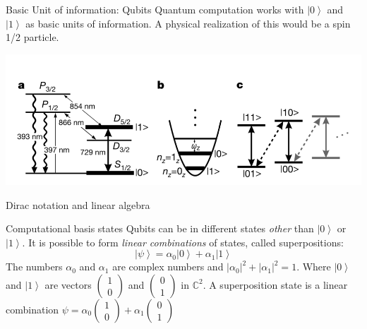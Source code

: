 \documentclass{beamer}
\newcommand{\ket}[1]{\left| #1 \right>} %
\begin{document}
\begin{frame}{Basic Unit of information: Qubits}
	\justifying
	Quantum computation works with $\ket{0}$ and $\ket{1}$ as basic units of information. A physical realization of this would be a spin 1/2 particle.
	
	\center
	\includegraphics[keepaspectratio=true,width=.8\paperwidth]{.attachments/Qubit.png}
\end{frame}

\begin{frame}{Dirac notation and linear algebra}
	\justifying 

	
	
\end{frame}

\begin{frame}{Computational basis states}
	\justifying
	Qubits can be in different states \textit{other} than $\ket{0}$ or $\ket{1}$. It is possible to form \textit{linear combinations} of states, called superpositions:
	$$\ket{\psi}= \alpha_0 \ket{0} + \alpha_1 \ket{1}$$
    The numbers $\alpha_0$ and $\alpha_1$ are complex numbers and ${|\alpha_0|}^2+|\alpha_1|^2=1$. 
    \newline
    \newline
Where $\ket{0}$ and $\ket{1}$ are vectors $\begin{pmatrix} 1 \\ 0 \end{pmatrix}$ and $\begin{pmatrix} 0 \\1 \end{pmatrix}$ in ${\mathbb{C}}^2$.
    \newline
    \newline
	A superposition state is a linear combination $ \psi =\alpha_0 \begin{pmatrix} 1 \\ 0 \end{pmatrix} + \alpha_1 \begin{pmatrix} 0 \\ 1 \end{pmatrix}$
\end{frame}
\end{document}
